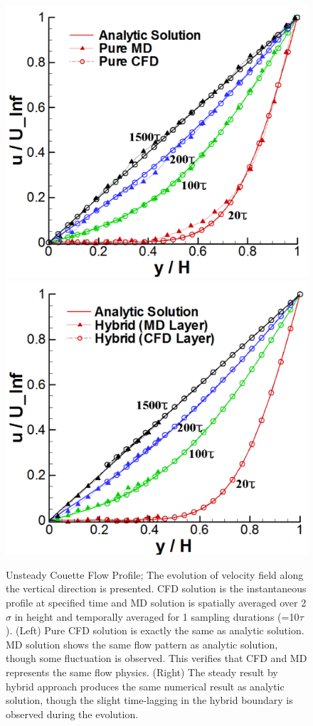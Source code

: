 \documentclass[preprint,12pt]{elsarticle}
\begin{document}
\begin{figure}
\centering
\includegraphics[width=0.6\linewidth]{Flat_Plate_Sol1_New.pdf}
\hskip 1cm
\includegraphics[width=0.6\linewidth]{Flat_Plate_Sol2_New.pdf}
\vskip-0.2cm
\caption{\small Unsteady Couette Flow Profile; The evolution of velocity field along the vertical direction is presented. CFD solution is the instantaneous profile at specified time and MD solution is spatially averaged over 2 $\sigma$ in height and temporally averaged for 1 sampling durations (=10$\tau$). (Left) Pure CFD solution is exactly the same as analytic solution. MD solution shows the same flow pattern as analytic solution, though some fluctuation is observed. This verifies that CFD and MD represents the same flow physics. (Right) The steady result by hybrid approach produces the same numerical result as analytic solution, though the slight time-lagging in the hybrid boundary is observed during the evolution.}
\label{Flat_Plate_Sol}
\end{figure}


\end{document}
